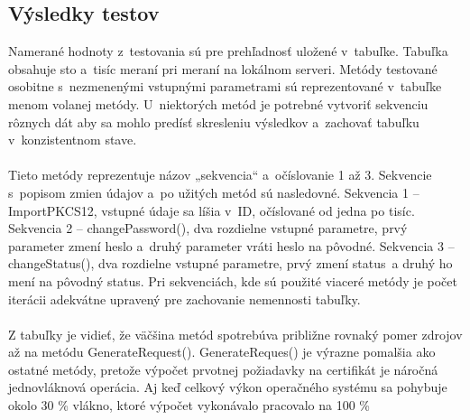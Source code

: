 \documentclass[
  digital, %
  table,   %
oneside,
  nolof,     %
  nolot,     %
]{fithesis3}
\begin{document}
\subsection{Výsledky testov}
Namerané hodnoty z~testovania sú pre prehľadnosť uložené v~tabuľke. Tabuľka obsahuje sto a~tisíc meraní pri meraní na lokálnom serveri. Metódy testované osobitne s~nezmenenými vstupnými parametrami sú reprezentované v~tabuľke menom volanej metódy. U~niektorých metód je potrebné vytvoriť sekvenciu rôznych dát aby sa mohlo predísť skresleniu výsledkov a~zachovať tabuľku v~konzistentnom stave. \paragraph{}
Tieto metódy reprezentuje názov „sekvencia“ a~očíslovanie 1 až 3. Sekvencie s~popisom zmien údajov  a~po užitých metód sú nasledovné.
Sekvencia 1 – ImportPKCS12, vstupné údaje sa líšia v~ID, očíslované od jedna po tisíc.
Sekvencia 2 – changePassword(), dva rozdielne vstupné parametre, prvý parameter zmení heslo  a~druhý parameter vráti heslo na pôvodné.
Sekvencia 3 – changeStatus(), dva rozdielne vstupné parametre, prvý zmení status~a druhý ho mení na pôvodný status. 
Pri sekvenciách, kde sú použité viaceré metódy je počet iterácii adekvátne upravený pre zachovanie nemennosti tabuľky. 
\begin{table}[htbp]
	\begin{center}
	\end{center}
	\caption{Ukážka nameraných hodnôt}
	\label{table:power}
\end{table}
\paragraph{}
Z tabuľky je vidieť, že väčšina metód spotrebúva približne rovnaký pomer zdrojov až na metódu GenerateRequest().  GenerateReques() je výrazne pomalšia ako ostatné metódy, pretože výpočet prvotnej požiadavky na certifikát je náročná jednovláknová operácia. Aj keď celkový výkon operačného systému sa pohybuje okolo 30 \% vlákno, ktoré výpočet vykonávalo pracovalo na 100 \% 
\end{document}
